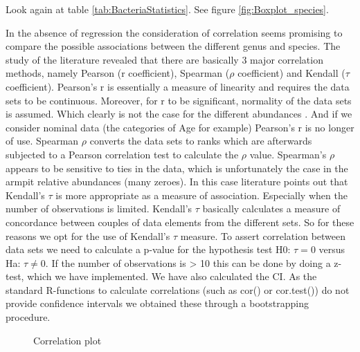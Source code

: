 

Look again at table \ref{tab:BacteriaStatistics}.
See figure \ref{fig:Boxplot_species}.

\begin{figure*}
    \centering
     \resizebox{\hsize}{!}{%
        
    }
    \caption{Boxplots indicating the variation of relative abuncances of different species in the data}
    \label{fig:Boxplot_species}
\end{figure*}

In the absence of regression the consideration of correlation seems promising to compare the possible associations between the different genus and species. 
The study of the literature revealed that there are basically 3 major correlation methods, 
namely Pearson (r coefficient), Spearman ($\rho$ coefficient) and Kendall ($\tau$ coefficient).
Pearson’s r  is essentially a measure of linearity and requires the data sets to be continuous. 
Moreover, for r to be significant, normality of the data sets is assumed. Which clearly is not the case for the different abundances . 
And if we consider nominal data (the categories of Age for example) Pearson’s r is no longer of use.
Spearman $\rho$ converts the data sets to ranks which are afterwards subjected to a Pearson correlation test to calculate the $\rho$ value. Spearman’s $\rho$ appears to be sensitive to ties in the data, 
which is unfortunately the case in the armpit relative abundances (many zeroes). 
In this case literature points out that Kendall’s $\tau$ is more appropriate as a measure of association. Especially when the number of observations is limited. Kendall’s $\tau$ basically calculates a measure of concordance between couples of data elements from the different sets. 
So for these reasons we opt for the use of Kendall’s $\tau$ measure.
To assert correlation between data sets we need to calculate a p-value for the hypothesis test H0: 
$\tau = 0$ versus Ha: $\tau \neq 0$. If the number of observations is > 10 this can be done by doing a z-test, which we have implemented.
We have also calculated the CI. As the standard R-functions to calculate correlations (such as cor() or cor.test()) do not provide confidence intervals we obtained these through a bootstrapping procedure.

\begin{figure}
    \centering
     \resizebox{\hsize}{!}{%
        
    }
    \caption{Correlation plot }
    \label{fig:correlation}
\end{figure}

